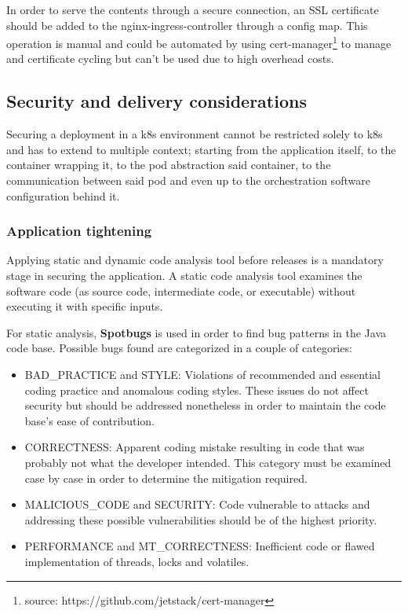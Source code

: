 \documentclass[11pt]{article}
\begin{document}
In order to serve the contents through a secure connection, an SSL certificate should be added to the nginx-ingress-controller through a config map. This operation is manual and could be automated by using cert-manager\footnote{source: https://github.com/jetstack/cert-manager} to manage and certificate cycling but can't be used due to high overhead costs.

\subsection{Security and delivery  considerations}

\hspace{5mm} Securing a deployment in a k8s environment cannot be restricted solely to k8s and has to extend to multiple context; starting from the application itself, to the container wrapping it, to the pod abstraction said container, to the communication between said pod and even up to the orchestration software configuration behind it.

\subsubsection{Application tightening}

\hspace{5mm} Applying static and dynamic code analysis tool before releases is a mandatory stage in securing the application. A static code analysis tool examines the software code (as source code, intermediate code, or executable) without executing it with specific inputs. 

For static analysis, \textbf{Spotbugs} is used in order to find bug patterns in the Java code base. Possible bugs found are categorized in a couple of categories:
\begin{itemize}
    \item BAD\_PRACTICE and STYLE: Violations of recommended and essential coding practice and anomalous coding styles. These issues do not affect security but should be addressed nonetheless in order to maintain the code base's ease of contribution.
    \item CORRECTNESS: Apparent coding mistake resulting in code that was probably not what the developer intended. This category must be examined case by case in order to determine the mitigation required.
    \item MALICIOUS\_CODE and SECURITY: Code vulnerable to attacks and addressing these possible vulnerabilities should be of the highest priority.
    \item PERFORMANCE and MT\_CORRECTNESS: Inefficient code or flawed implementation of threads, locks and volatiles. 
\end{itemize}
\end{document}
